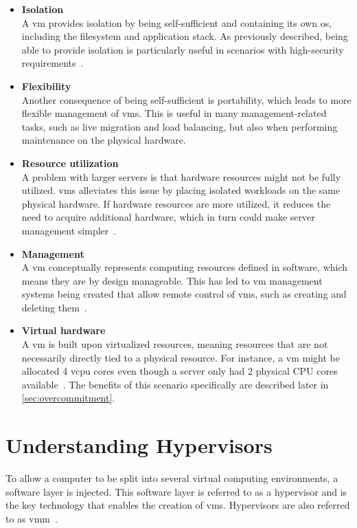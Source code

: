\documentclass{kththesis}
\begin{document}
\begin{itemize}
    \item \textbf{Isolation}\\
    A \Gls{vm} provides isolation by being self-sufficient and containing its own \Gls{os}, including the filesystem and application stack. As previously described, being able to provide isolation is particularly useful in scenarios with high-security requirements\ \cite{vm-docker-reproducibility}.
    \item \textbf{Flexibility}\\
    Another consequence of being self-sufficient is portability, which leads to more flexible management of \Glspl{vm}. This is useful in many management-related tasks, such as live migration and load balancing, but also when performing maintenance on the physical hardware.
    \item \textbf{Resource utilization}\\
    A problem with larger servers is that hardware resources might not be fully utilized. \Glspl{vm} alleviates this issue by placing isolated workloads on the same physical hardware. If hardware resources are more utilized, it reduces the need to acquire additional hardware, which in turn could make server management simpler\ \cite{virtualization-basics}.
    \item \textbf{Management}\\
    A \Gls{vm} conceptually represents computing resources defined in software, which means they are by design manageable. This has led to \Gls{vm} management systems being created that allow remote control of \Glspl{vm}, such as creating and deleting them\ \cite{virtualization-basics}.
    \item \textbf{Virtual hardware}\\ 
    A \Gls{vm} is built upon virtualized resources, meaning resources that are not necessarily directly tied to a physical resource. For instance, a \Gls{vm} might be allocated 4 \Gls{vcpu} cores even though a server only had 2 physical CPU cores available\ \cite{virtualization-basics}. The benefits of this scenario specifically are described later in \ref{sec:overcommitment}.
\end{itemize}

\section{Understanding Hypervisors}
\label{hypervisors}
To allow a computer to be split into several virtual computing environments, a software layer is injected. This software layer is referred to as a hypervisor and is the key technology that enables the creation of \Glspl{vm}. Hypervisors are also referred to as \Gls{vmm}\ \cite{virtualization-history, hypervisor-survey}.
\end{document}
